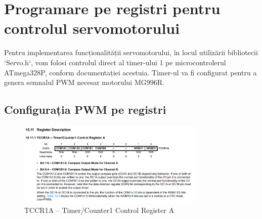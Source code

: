 \documentclass{report}
\begin{document}
\newpage
\vspace*{1cm}
\section{Programare pe registri pentru controlul servomotorului}

Pentru implementarea funcționalității servomotorului, în locul utilizării bibliotecii `Servo.h`, vom folosi controlul direct al timer-ului 1 pe microcontrolerul ATmega328P, conform documentației acestuia. Timer-ul va fi configurat pentru a genera semnalul PWM necesar motorului MG996R.

\subsection*{Configurația PWM pe registri}

\begin{figure}[H]
    \centering
    \includegraphics[width=0.8\textwidth]{tccr1a.png}
    \caption{ TCCR1A – Timer/Counter1 Control Register A}
    \label{fig:TCCR1A}
\end{figure}
\end{document}
